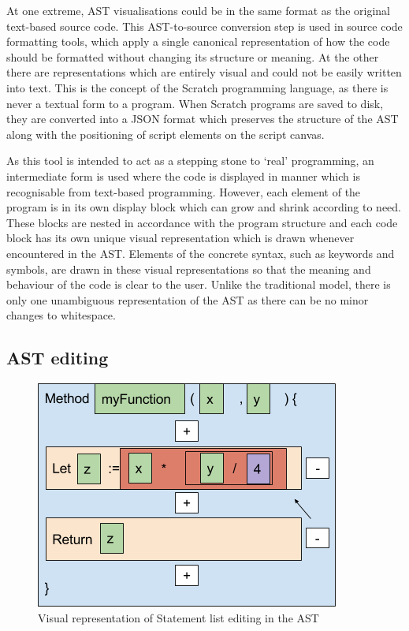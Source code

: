 At one extreme, AST visualisations could be in the same format as the original text-based source code. This AST-to-source conversion step is used in source code formatting tools, which apply a single canonical representation of how the code should be formatted without changing its structure or meaning. At the other there are representations which are entirely visual and could not be easily written into text. This is the concept of the Scratch programming language, as there is never a textual form to a program. When Scratch programs are saved to disk, they are converted into a JSON format which preserves the structure of the AST along with the positioning of script elements on the script canvas.

As this tool is intended to act as a stepping stone to ‘real’ programming, an intermediate form is used where the code is displayed in manner which is recognisable from text-based programming. However, each element of the program is in its own display block which can grow and shrink according to need. These blocks are nested in accordance with the program structure and each code block has its own unique visual representation which is drawn whenever encountered in the AST. Elements of the concrete syntax, such as keywords and symbols, are drawn in these visual representations so that the meaning and behaviour of the code is clear to the user. Unlike the traditional model, there is only one unambiguous representation of the AST as there can be no minor changes to whitespace.

\subsection{AST editing}

\begin{figure}[H]
\centering
\includegraphics[scale=0.5]{graphics/aststatement1} %
\caption{Visual representation of Statement list editing in the AST}
\label{fig:aststatment1} %
\end{figure}

